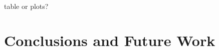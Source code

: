 \documentclass{llncs}
\begin{document}

table or plots?


\section{Conclusions and Future Work}
\label{sec-concl}



%
 
\end{document}
